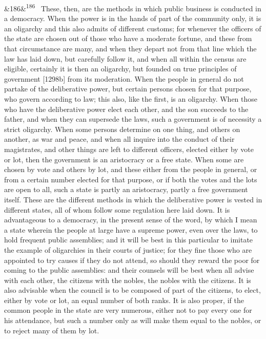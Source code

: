 \documentclass[12pt]{article}
\newcommand{\para}[1][]{\par\noindent\ifx&#1&\else\textsuperscript{\footnotesize #1}~\fi}
\begin{document}
\para[186] These, then, are the methods in which public business is conducted in a democracy. When the power is in the hands of part of the community only, it is an oligarchy and this also admits of different customs; for whenever the officers of the state are chosen out of those who have a moderate fortune, and these from that circumstance are many, and when they depart not from that line which the law has laid down, but carefully follow it, and when all within the census are eligible, certainly it is then an oligarchy, but founded on true principles of government [1298b] from its moderation. When the people in general do not partake of the deliberative power, but certain persons chosen for that purpose, who govern according to law; this also, like the first, is an oligarchy. When those who have the deliberative power elect each other, and the son succeeds to the father, and when they can supersede the laws, such a government is of necessity a strict oligarchy. When some persons determine on one thing, and others on another, as war and peace, and when all inquire into the conduct of their magistrates, and other things are left to different officers, elected either by vote or lot, then the government is an aristocracy or a free state. When some are chosen by vote and others by lot, and these either from the people in general, or from a certain number elected for that purpose, or if both the votes and the lots are open to all, such a state is partly an aristocracy, partly a free government itself. These are the different methods in which the deliberative power is vested in different states, all of whom follow some regulation here laid down. It is advantageous to a democracy, in the present sense of the word, by which I mean a state wherein the people at large have a supreme power, even over the laws, to hold frequent public assemblies; and it will be best in this particular to imitate the example of oligarchies in their courts of justice; for they fine those who are appointed to try causes if they do not attend, so should they reward the poor for coming to the public assemblies: and their counsels will be best when all advise with each other, the citizens with the nobles, the nobles with the citizens. It is also advisable when the council is to be composed of part of the citizens, to elect, either by vote or lot, an equal number of both ranks. It is also proper, if the common people in the state are very numerous, either not to pay every one for his attendance, but such a number only as will make them equal to the nobles, or to reject many of them by lot.
\end{document}
